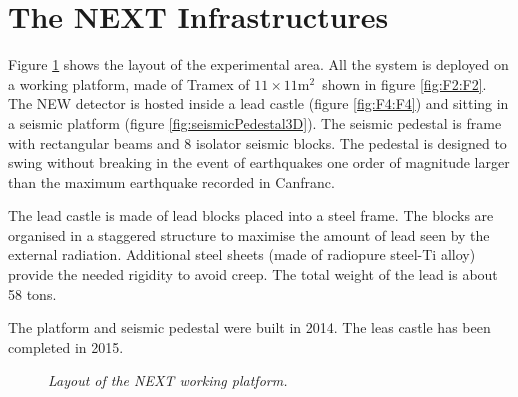\section{The NEXT Infrastructures}
\label{sec.infra}


Figure \ref{fig:F6:F6} shows the layout of the experimental area. All the system is deployed on a working platform, made of Tramex of $11 \times 11 \mathrm{m^2}$~shown in figure \ref{fig:F2:F2}. The NEW detector is hosted inside a lead castle (figure \ref{fig:F4:F4}) and sitting in a seismic platform (figure \ref{fig:seismicPedestal3D}). 
The seismic pedestal is frame with rectangular beams and 8 isolator seismic blocks. The pedestal is designed to swing without breaking in the event of earthquakes one order of magnitude larger than the maximum earthquake recorded in Canfranc. 

The lead castle is made of lead blocks placed into a steel frame. The blocks are organised in a staggered structure to maximise the amount of lead seen by the external radiation. Additional steel sheets (made of radiopure steel-Ti alloy) provide the needed rigidity to avoid creep. The total weight of the lead is about 58 tons. 

The platform and seismic pedestal were built in 2014. The leas castle has been completed in 2015.


\begin{figure}[hpt!]
    \bigskip
    \begin{center}\leavevmode
        \caption{\textit{Layout of the NEXT working platform.}}
        \label{fig:F6:F6}
    \end{center}
\end{figure}

